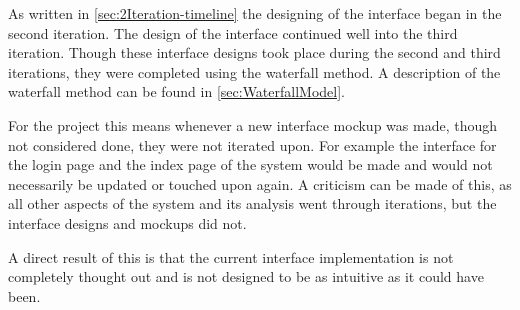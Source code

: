 As written in \cref{sec:2Iteration-timeline} the designing of the interface began in the second iteration.
The design of the interface continued well into the third iteration.
Though these interface designs took place during the second and third iterations, they were completed using the waterfall method.
A description of the waterfall method can be found in \cref{sec:WaterfallModel}.

For the project this means whenever a new interface mockup was made, though not considered done, they were not iterated upon.
For example the interface for the login page and the index page of the system would be made and would not necessarily be updated or touched upon again.
A criticism can be made of this, as all other aspects of the system and its analysis went through iterations, but the interface designs and mockups did not.

A direct result of this is that the current interface implementation is not completely thought out and is not designed to be as intuitive as it could have been.
